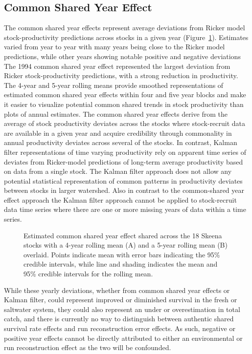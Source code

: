 \documentclass[french,11pt]{book}
\begin{document}
\endgroup{} \endgroup{}

\subsection{Common Shared Year Effect}\label{common-shared-year-effect}

The common shared year effects represent average deviations from Ricker model stock-productivity predictions across stocks in a given year (Figure~\ref{fig:HBMYrEff}). Estimates varied from year to year with many years being close to the Ricker model predictions, while other years showing notable positive and negative deviations The 1994 common shared year effect represented the largest deviation from Ricker stock-productivity predictions, with a strong reduction in productivity. The 4-year and 5-year rolling means provide smoothed representations of estimated common shared year effects within four and five year blocks and make it easier to visualize potential common shared trends in stock productivity than plots of annual estimates. The common shared year effects derive from the average of stock productivity deviates across the stocks where stock-recruit data are available in a given year and acquire credibility through commonality in annual productivity deviates across several of the stocks. In contrast, Kalman filter representations of time varying productivity rely on apparent time series of deviates from Ricker-model predictions of long-term average productivity based on data from a single stock. The Kalman filter approach does not allow any potential statistical representation of common patterns in productivity deviates between stocks in larger watershed. Also in contrast to the common-shared year effect approach the Kalman filter approach cannot be applied to stock-recruit data time series where there are one or more missing years of data within a time series.
\begin{figure}[htb]

{\centering {} 

}

\caption{Estimated common shared year effect shared across the 18 Skeena stocks with a 4-year rolling mean (A) and a 5-year rolling mean (B) overlaid. Points indicate mean with error bars indicating the 95\% credible intervals, while line and shading indicates the mean and 95\% credible intervals for the rolling mean.}\label{fig:HBMYrEff}
\end{figure}
While these yearly deviations, whether from common shared year effects or Kalman filter, could represent improved or diminished survival in the fresh or saltwater system, they could also represent an under or overestimation in total catch, and there is currently no way to distinguish between authentic shared survival rate effects and run reconstruction error effects. As such, negative or positive year effects cannot be directly attributed to either an environmental or run reconstruction effect as the two will be confounded.
\end{document}
